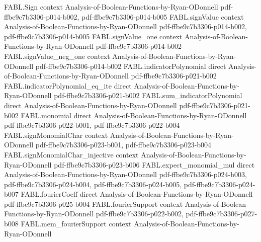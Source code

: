 \begin{theorem}
\label{FABL.totalInfluence_toReal_eq_spectralSample_expectedCard}
\leanok
{}
\proofstep
  {FABL.Sign}
  {context}
  {Analysis-of-Boolean-Functions-by-Ryan-ODonnell}
  {pdf-ffbe9c7b3306-p014-b002,
    pdf-ffbe9c7b3306-p014-b005}
\proofstep
  {FABL.signValue}
  {context}
  {Analysis-of-Boolean-Functions-by-Ryan-ODonnell}
  {pdf-ffbe9c7b3306-p014-b002,
    pdf-ffbe9c7b3306-p014-b005}
\proofstep
  {FABL.signValue_one}
  {context}
  {Analysis-of-Boolean-Functions-by-Ryan-ODonnell}
  {pdf-ffbe9c7b3306-p014-b002}
\proofstep
  {FABL.signValue_neg_one}
  {context}
  {Analysis-of-Boolean-Functions-by-Ryan-ODonnell}
  {pdf-ffbe9c7b3306-p014-b002}
\proofstep
  {FABL.indicatorPolynomial}
  {direct}
  {Analysis-of-Boolean-Functions-by-Ryan-ODonnell}
  {pdf-ffbe9c7b3306-p021-b002}
\proofstep
  {FABL.indicatorPolynomial_eq_ite}
  {direct}
  {Analysis-of-Boolean-Functions-by-Ryan-ODonnell}
  {pdf-ffbe9c7b3306-p021-b002}
\proofstep
  {FABL.sum_indicatorPolynomial}
  {direct}
  {Analysis-of-Boolean-Functions-by-Ryan-ODonnell}
  {pdf-ffbe9c7b3306-p021-b002}
\proofstep
  {FABL.monomial}
  {direct}
  {Analysis-of-Boolean-Functions-by-Ryan-ODonnell}
  {pdf-ffbe9c7b3306-p022-b001,
    pdf-ffbe9c7b3306-p022-b004}
\proofstep
  {FABL.signMonomialChar}
  {context}
  {Analysis-of-Boolean-Functions-by-Ryan-ODonnell}
  {pdf-ffbe9c7b3306-p023-b001,
    pdf-ffbe9c7b3306-p023-b004}
\proofstep
  {FABL.signMonomialChar_injective}
  {context}
  {Analysis-of-Boolean-Functions-by-Ryan-ODonnell}
  {pdf-ffbe9c7b3306-p023-b006}
\proofstep
  {FABL.expect_monomial_mul}
  {direct}
  {Analysis-of-Boolean-Functions-by-Ryan-ODonnell}
  {pdf-ffbe9c7b3306-p024-b003,
    pdf-ffbe9c7b3306-p024-b004,
    pdf-ffbe9c7b3306-p024-b005,
    pdf-ffbe9c7b3306-p024-b007}
\proofstep
  {FABL.fourierCoeff}
  {direct}
  {Analysis-of-Boolean-Functions-by-Ryan-ODonnell}
  {pdf-ffbe9c7b3306-p025-b004}
\proofstep
  {FABL.fourierSupport}
  {context}
  {Analysis-of-Boolean-Functions-by-Ryan-ODonnell}
  {pdf-ffbe9c7b3306-p022-b002,
    pdf-ffbe9c7b3306-p027-b008}
\proofstep
  {FABL.mem_fourierSupport}
  {context}
  {Analysis-of-Boolean-Functions-by-Ryan-ODonnell}

\end{theorem}
